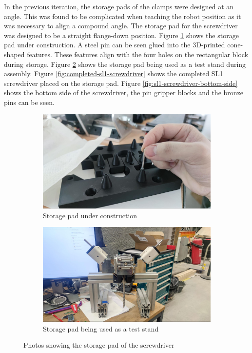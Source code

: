 In the previous iteration, the storage pads of the clamps were designed at an angle. This was found to be complicated when teaching the robot position as it was necessary to align a compound angle. The storage pad for the screwdriver was designed to be a straight flange-down position. Figure \ref{fig:storage-pad-under-construction} shows the storage pad under construction. A steel pin can be seen glued into the 3D-printed cone-shaped features. These features align with the four holes on the rectangular block during storage. Figure \ref{fig:storage-pad-as-test-stand} shows the storage pad being used as a test stand during assembly. 
Figure \ref{fig:completed-sl1-screwdriver} shows the completed SL1 screwdriver placed on the storage pad. Figure \ref{fig:sl1-screwdriver-bottom-side} shows the bottom side of the screwdriver, the pin gripper blocks and the bronze pins can be seen. 

\begin{figure}[!h]
    \centering
    \begin{subfigure}[b]{0.49\textwidth}
        \centering
        \includegraphics[width=\textwidth]{images/7a/img52.jpg}
        \caption{Storage pad under construction}
        \label{fig:storage-pad-under-construction}
    \end{subfigure}
    \hfill
    \begin{subfigure}[b]{0.49\textwidth}
        \centering
        \includegraphics[width=\textwidth]{images/7a/img53.jpg}
        \caption{Storage pad being used as a test stand}
        \label{fig:storage-pad-as-test-stand}
    \end{subfigure}
    \caption{Photos showing the storage pad of the screwdriver}
    \label{fig:storage-pad-screwdriver}
\end{figure}


